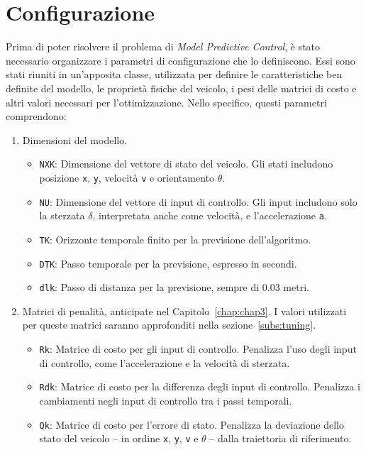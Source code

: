 \section{Configurazione}
Prima di poter risolvere il problema di \textit{Model Predictive Control}, è stato necessario 
organizzare i parametri di configurazione che lo definiscono. Essi sono stati riuniti in 
un'apposita classe, utilizzata per definire le caratteristiche ben definite del modello, 
le proprietà fisiche del veicolo, i pesi delle matrici di costo e altri valori necessari per l'ottimizzazione. 
Nello specifico, questi parametri comprendono:
\begin{enumerate}
    \item Dimensioni del modello.
    \begin{itemize}
        \item \verb|NXK|: Dimensione del vettore di stato del veicolo. 
        Gli stati includono posizione \verb|x|, \verb|y|, velocità \verb|v| e orientamento $\theta$.
        \item \verb|NU|: Dimensione del vettore di input di controllo. Gli input includono solo la sterzata $\delta$, interpretata anche come velocità, e l'accelerazione \verb|a|.
        \item \verb|TK|: Orizzonte temporale finito per la previsione dell'algoritmo.
        \item \verb|DTK|: Passo temporale per la previsione, espresso in secondi.
        \item \verb|dlk|: Passo di distanza per la previsione, sempre di 0.03 metri.
    \end{itemize}
    \item Matrici di penalità, anticipate nel Capitolo~\ref{chap:chap3}. I valori utilizzati per queste matrici saranno approfonditi nella sezione~\ref{subs:tuning}.
    \begin{itemize}
        \item \texttt{Rk}: Matrice di costo per gli input di controllo. 
        Penalizza l'uso degli input di controllo, come l'accelerazione e la velocità di sterzata.
        \item \texttt{Rdk}: Matrice di costo per la differenza degli input 
        di controllo. Penalizza i cambiamenti negli input di controllo tra i passi temporali.
        \item \texttt{Qk}: Matrice di costo per l'errore di stato. 
        Penalizza la deviazione dello stato del veicolo -- in ordine
        \verb|x|, \verb|y|, \verb|v| e $\theta$ -- dalla traiettoria di riferimento.

\end{itemize}
\end{enumerate}
